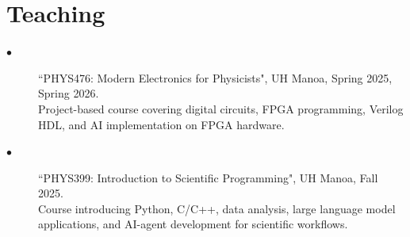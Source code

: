 \documentclass[11pt]{article}
\begin{document}
\section*{\large{Teaching}} 
{\footnotesize
\begin{description}
\item[$\bullet$]  {``PHYS476: Modern Electronics for Physicists", UH Manoa, Spring 2025, Spring 2026. \\
\hspace{-0.25in}
Project-based course covering digital circuits, FPGA programming, Verilog HDL, and AI implementation on FPGA hardware.}
\item[$\bullet$]  {``PHYS399: Introduction to Scientific Programming", UH Manoa, Fall 2025. \\
\hspace{-0.25in}
Course introducing Python, C/C++, data analysis, large language model applications, and AI-agent development for scientific workflows.}
\end{description}
}

\end{document}
